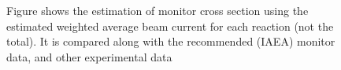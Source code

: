 \begin{figure}
    \quad
    \quad
    \quad
    \quad
    \caption{Figure shows the estimation of monitor cross section using the estimated weighted average beam current for each reaction (not the total). It is compared along with the recommended (IAEA) monitor data, and other experimental data  }%
    \label{fig:monitor_BC+CS}%
\end{figure}

